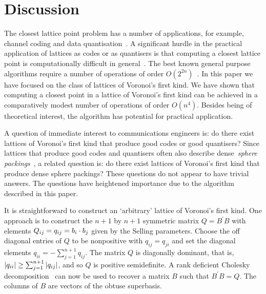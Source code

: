 \documentclass[final,leqno]{siamltex}
\begin{document}
\section{Discussion}\label{sec:discussion} 

The closest lattice point problem has a number of applications, for example, channel coding and data quantisation~\cite{Conway1983VoronoiCodes,Conway1982VoronoiRegions,Conway1982FastQuantDec,Erex2004_lattice_decoding,Erez2005}.  A significant hurdle in the practical application of lattices as codes or as quantisers is that computing a closest lattice point is computationally difficult in general~\cite{micciancio_hardness_2001}.  The best known general purpose algorithms require a number of operations of order $O(2^{2n})$~\cite{Micciancio09adeterministic}.  In this paper we have focused on the class of lattices of Voronoi's first kind.  We have shown that computing a closest point in a lattice of Voronoi's first kind can be achieved in a comparatively modest number of operations of order $O(n^4)$.  Besides being of theoretical interest, the algorithm has potential for practical application.

A question of immediate interest to communications engineers is: do there exist lattices of Voronoi's first kind that produce good codes or good quantisers?  Since lattices that produce good codes and quantisers often also describe dense~\emph{sphere packings}~\cite{SPLAG}, a related question is: do there exist lattices of Voronoi's first kind that produce dense sphere packings?  These questions do not appear to have trivial answers.  The questions have heightened importance due to the algorithm described in this paper.

It is straightforward to construct an `arbitrary' lattice of Voronoi's first kind.  One approach is to construct the $n+1$ by $n+1$ symmetric matrix $Q = B^\prime B$ with elements $Q_{ij} = q_{ij} = b_{i} \cdot b_j$ given by the Selling parameters.  Choose the off diagonal entries of $Q$ to be nonpositive with $q_{ij}=q_{ji}$ and set the diagonal elements $q_{ii} = -\sum_{j=1}^{n+1} q_{ij}$.  %
The matrix $Q$ is diagonally dominant, that is, ${\left| q_{ii} \right|} \geq \sum_{j=1}^{n+1} {\left| q_{ij} \right|}$, and so $Q$ is positive semidefinite.  A rank deficient Cholesky decomposition~\cite{Higham90analysisof} can now be used to recover a matrix $B$ such that $B^\prime B  = Q$. The columns of $B$ are vectors of the obtuse superbasis.
\end{document}

